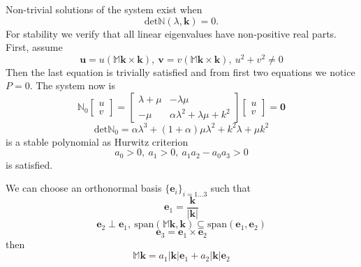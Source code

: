 \documentclass[12pt]{article}
\numberwithin{theorem}{section}
\begin{document}
Non-trivial solutions of the system exist when \begin{equation}\mathrm{det}\mathbb{N}(\lambda, \mathbf{k}) = 0.\end{equation} For stability we verify that all linear eigenvalues have non-positive real parts. First, assume \begin{equation}\mathbf{u} = u (\mathbb{M}\mathbf{k} \times \mathbf{k}),\ \mathbf{v} = v (\mathbb{M}\mathbf{k} \times \mathbf{k}),\ u^2+v^2\ne 0\end{equation} Then the last equation is trivially satisfied and from first two equations we notice $P=0.$ The system now is 
\begin{equation}
\mathbb{N}_0 \left[\begin{array}{c} 
u \\ v
\end{array} 
\right]=
\left[ 
\begin{array}{cc} 
\lambda + \mu & -\lambda\mu \\
-\mu & \alpha\lambda^2 + \lambda\mu+k^2
\end{array} 
\right] 
\left[\begin{array}{c} 
u \\ v
\end{array} 
\right]=\mathbf{0} 
\end{equation}
 \begin{equation}\label{cubic_stability_1} \mathrm{det}\mathbb{N}_0 =
 \alpha\lambda^3 + (1+\alpha)\mu\lambda^2 + k^2\lambda + \mu k^2\end{equation}
 is a stable polynomial as Hurwitz criterion
 \begin{equation}a_0 > 0,\ a_1 > 0,\ a_1a_2-a_0a_3 > 0\end{equation}
 is satisfied.

We can choose an orthonormal basis $\{\mathbf{e}_i\}_{i=1\ldots3}$ such that
\begin{equation}\mathbf{e}_1 = \frac{\mathbf{k}}{|\mathbf{k}|}\end{equation}
\begin{equation}\mathbf{e}_2 \perp \mathbf{e}_1, \ \mathrm{span}(\mathbb{M}\mathbf{k}, \mathbf{k}) \subseteq \mathrm{span}(\mathbf{e}_1,\mathbf{e}_2)
\end{equation}
\begin{equation}\mathbf{e}_3 = \mathbf{e}_1 \times \mathbf{e}_2\end{equation} then
\begin{equation}\mathbb{M}\mathbf{k} =a_1 |\mathbf{k}|\mathbf{e}_1 + a_2 |\mathbf{k}|\mathbf{e}_2
\end{equation}
\end{document}
